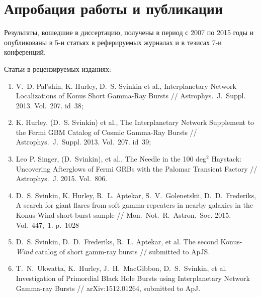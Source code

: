 \section*{Апробация работы и публикации}
Результаты, вошедшие в диссертацию, получены в период с 2007 по 2015
годы и опубликованы в 5-и статьях в реферируемых журналах и в тезисах 7-и конференций. 

Статьи в рецензируемых изданиях:
\begin{enumerate}
\item V.~D. Pal'shin, K. Hurley, D.~S. Svinkin et al., Interplanetary Network Localizations of
Konus Short Gamma-Ray Bursts // Astrophys.~J.~Suppl. 2013. Vol.~207. id~38;
\item K. Hurley, (D.~S. Svinkin) et al., The Interplanetary Network Supplement to 
the Fermi GBM Catalog of Cosmic Gamma-Ray Bursts // Astrophys.~J.~Suppl. 2013. Vol.~207. id~39;
\item Leo P. Singer, (D.~Svinkin), et al., The Needle in the 100 deg$^2$ Haystack: 
Uncovering Afterglows of Fermi GRBs with the Palomar Transient Factory // 
Astrophys.~J. 2015. Vol.~806.
\item D.~S. Svinkin, K. Hurley, R.~L. Aptekar, S.~V.~Golenetskii, D.~D.~Frederiks, 
A search for giant flares from soft gamma-repeaters in nearby galaxies in the 
Konus-Wind short burst sample // Mon.~Not.~R.~Astron.~Soc. 2015. Vol.~447,~1. p.~1028
\item D.~S. Svinkin, D.~D.~Frederiks, R.~L. Aptekar, et al.
The second Konus-\textit{Wind} catalog of short gamm-ray bursts // submitted to ApJS.
\item T.~N.~Ukwatta, K.~Hurley, J.~H.~MacGibbon, D.~S.~Svinkin, et al.
Investigation of Primordial Black Hole Bursts using Interplanetary Network Gamma-ray Bursts // 
arXiv:1512.01264, submitted to ApJ.

\end{enumerate}

